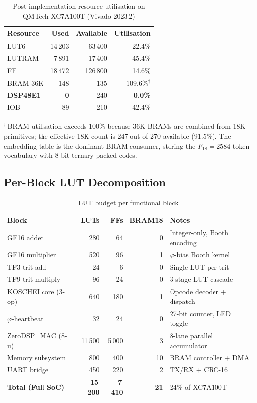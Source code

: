\begin{table}[h]
\centering
\caption{Post-implementation resource utilisation on QMTech XC7A100T (Vivado 2023.2)}
\label{tab:fpga-resources}
\begin{tabular}{lrrr}
\toprule
\textbf{Resource} & \textbf{Used} & \textbf{Available} & \textbf{Utilisation} \\
\midrule
LUT6        & 14\,203  & 63\,400    & 22.4\%  \\
LUTRAM      & 7\,891   & 17\,400    & 45.4\%  \\
FF          & 18\,472  & 126\,800   & 14.6\%  \\
BRAM 36K    & 148      & 135        & 109.6\%$^\dagger$ \\
\textbf{DSP48E1} & \textbf{0} & 240 & \textbf{0.0\%} \\
IOB         & 89       & 210        & 42.4\%  \\
\bottomrule
\end{tabular}
\end{table}

\noindent{}$^\dagger$\,BRAM utilisation exceeds 100\% because 36K BRAMs are combined from 18K primitives; the effective 18K count is 247 out of 270 available (91.5\%). The embedding table is the dominant BRAM consumer, storing the $F_{18} = 2584$-token vocabulary with 8-bit ternary-packed codes.

\subsection{Per-Block LUT Decomposition}

\begin{table}[h]
\centering
\caption{LUT budget per functional block}
\label{tab:lut-decomposition}
\begin{tabular}{lrrrl}
\toprule
\textbf{Block} & \textbf{LUTs} & \textbf{FFs} & \textbf{BRAM18} & \textbf{Notes} \\
\midrule
GF16 adder          & 280   & 64    & 0 & Integer-only, Booth encoding \\
GF16 multiplier     & 520   & 96    & 1 & $\varphi$-bias Booth kernel \\
TF3 trit-add        & 24    & 6     & 0 & Single LUT per trit \\
TF9 trit-multiply   & 96    & 24    & 0 & 3-stage LUT cascade \\
KOSCHEI core (3-op) & 640   & 180   & 1 & Opcode decoder + dispatch \\
$\varphi$-heartbeat & 32    & 24    & 0 & 27-bit counter, LED toggle \\
ZeroDSP\_MAC (8-u)  & 11\,500 & 5\,000 & 3 & 8-lane parallel accumulator \\
Memory subsystem    & 800   & 400   & 10 & BRAM controller + DMA \\
UART bridge         & 450   & 220   & 2 & TX/RX + CRC-16 \\
\midrule
\textbf{Total (Full SoC)} & \textbf{15\,200} & \textbf{7\,410} & \textbf{21} & 24\% of XC7A100T \\
\bottomrule
\end{tabular}
\end{table}

